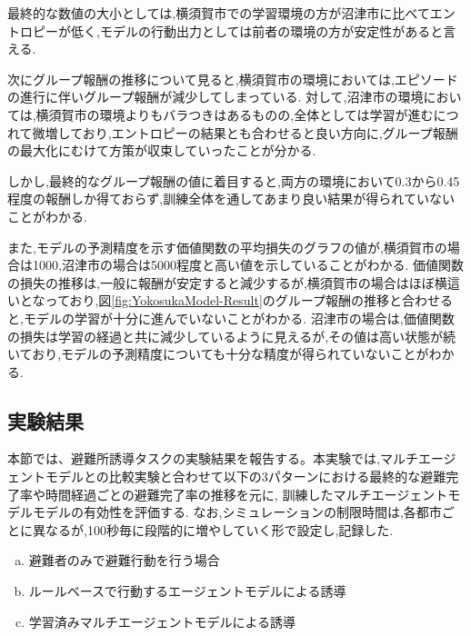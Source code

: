 最終的な数値の大小としては,横須賀市での学習環境の方が沼津市に比べてエントロピーが低く,モデルの行動出力としては前者の環境の方が安定性があると言える.\par 
次にグループ報酬の推移について見ると,横須賀市の環境においては,エピソードの進行に伴いグループ報酬が減少してしまっている.
対して,沼津市の環境においては,横須賀市の環境よりもバラつきはあるものの,全体としては学習が進むにつれて微増しており,エントロピーの結果とも合わせると良い方向に,グループ報酬の最大化にむけて方策が収束していったことが分かる.\par
しかし,最終的なグループ報酬の値に着目すると,両方の環境において0.3から0.45程度の報酬しか得ておらず,訓練全体を通してあまり良い結果が得られていないことがわかる.\par
また,モデルの予測精度を示す価値関数の平均損失のグラフの値が,横須賀市の場合は1000,沼津市の場合は5000程度と高い値を示していることがわかる.
価値関数の損失の推移は,一般に報酬が安定すると減少するが,横須賀市の場合はほぼ横這いとなっており,図\ref{fig:YokosukaModel-Result}のグループ報酬の推移と合わせると,モデルの学習が十分に進んでいないことがわかる.
沼津市の場合は,価値関数の損失は学習の経過と共に減少しているように見えるが,その値は高い状態が続いており,モデルの予測精度についても十分な精度が得られていないことがわかる.\par
\subsection{実験結果}
本節では、避難所誘導タスクの実験結果を報告する。本実験では,マルチエージェントモデルとの比較実験と合わせて以下の3パターンにおける最終的な避難完了率や時間経過ごとの避難完了率の推移を元に,
訓練したマルチエージェントモデルモデルの有効性を評価する.
なお,シミュレーションの制限時間は,各都市ごとに異なるが,100秒毎に段階的に増やしていく形で設定し,記録した.
\begin{enumerate}[(a)]
  \item 避難者のみで避難行動を行う場合
  \item ルールベースで行動するエージェントモデルによる誘導
  \item 学習済みマルチエージェントモデルによる誘導
\end{enumerate}
